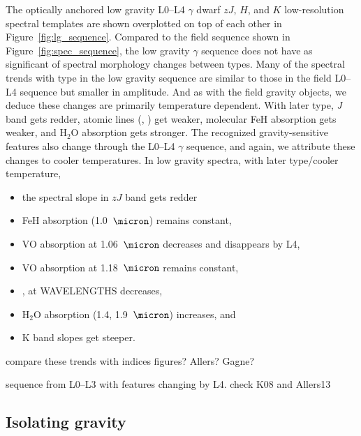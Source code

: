 \documentclass[12pt,preprint]{aastex}
\begin{document}
The optically anchored low gravity L0--L4 $\gamma$ dwarf $zJ$, $H$, and $K$ low-resolution spectral templates are shown overplotted on top of each other in Figure~\ref{fig:lg_sequence}. 
Compared to the field sequence shown in Figure~\ref{fig:spec_sequence}, the low gravity $\gamma$ sequence does not have as significant of spectral morphology changes between types.
Many of the spectral trends with type in the low gravity sequence are similar to those in the field L0--L4 sequence but smaller in amplitude. And as with the field gravity objects, we deduce these changes are primarily temperature dependent. With later type, \emph{J} band gets redder, atomic lines (, ) get weaker, molecular FeH absorption gets weaker, and H$_2$O absorption gets stronger. The recognized gravity-sensitive features also change through the L0--L4 $\gamma$ sequence, and again, we attribute these changes to cooler temperatures.
In low gravity spectra, with later type/cooler temperature,
\begin{itemize}
\item the spectral slope in $zJ$ band gets redder 
\item FeH absorption (1.0~$\micron$) remains constant,
\item VO absorption at 1.06~$\micron$ decreases and disappears by L4,
\item VO absorption at 1.18~$\micron$ remains constant,
\item {},  at WAVELENGTHS decreases, 
\item H$_2$O absorption (1.4, 1.9~$\micron$) increases, and
\item K band slopes get steeper. 
\end{itemize}


compare these trends with indices figures? Allers? Gagne?



sequence from L0--L3 with features changing by L4. check K08 and Allers13

\subsection{Isolating gravity} 
\end{document}
